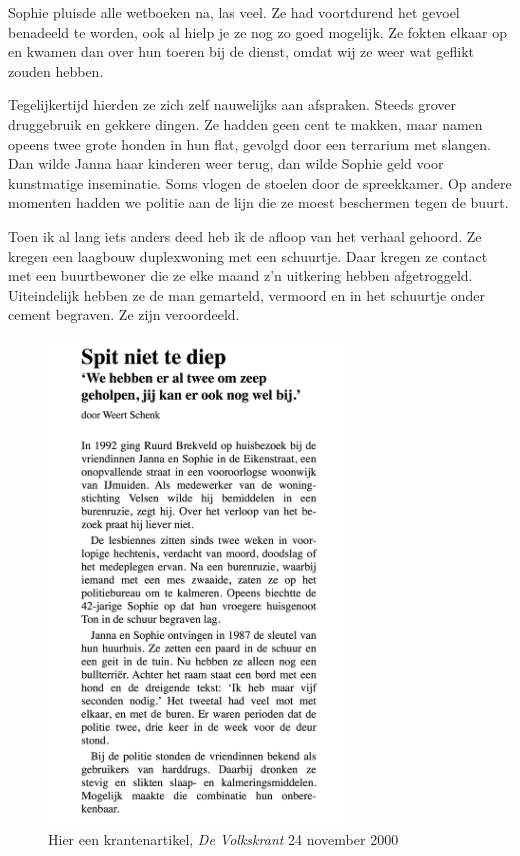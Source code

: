 \documentclass[10pt,twoside, openright]{memoir}
\begin{document}
Sophie pluisde alle wetboeken na, las veel. Ze had voortdurend het gevoel benadeeld te worden, ook al hielp je ze nog zo goed mogelijk. Ze fokten elkaar op en kwamen dan over hun toeren bij de dienst, omdat wij ze weer wat geflikt zouden hebben. 

Tegelijkertijd hierden ze zich zelf nauwelijks aan afspraken. Steeds grover druggebruik en gekkere dingen. Ze hadden geen cent te makken, maar namen opeens twee grote honden in hun flat, gevolgd door een terrarium met slangen. Dan wilde Janna haar kinderen weer terug, dan wilde Sophie geld voor kunstmatige inseminatie. Soms vlogen de stoelen door de spreekkamer. Op andere momenten hadden we politie aan de lijn die ze moest beschermen tegen de buurt. 

Toen ik al lang iets anders deed heb ik de afloop van het verhaal gehoord. Ze kregen een laagbouw duplexwoning met een schuurtje. Daar kregen ze contact met een buurtbewoner die ze elke maand z'n uitkering hebben afgetroggeld. Uiteindelijk hebben ze de man gemarteld, vermoord en in het schuurtje onder cement begraven. Ze zijn veroordeeld. 

\begin{figure}
\centering
\includegraphics[width=0.7\textwidth]{img/ch46/krant}
\caption*{\footnotesize Hier een krantenartikel, \emph{De Volkskrant} 24 november 2000}
\end{figure}
\end{document}

